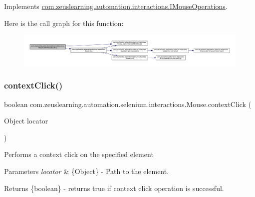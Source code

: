 Implements \hyperlink{interfacecom_1_1zeuslearning_1_1automation_1_1interactions_1_1IMouseOperations_a0a40b7faf1ddcc224debbe0c51526a4e}{com.\+zeuslearning.\+automation.\+interactions.\+I\+Mouse\+Operations}.

Here is the call graph for this function\+:
\nopagebreak
\begin{figure}[H]
\begin{center}
\leavevmode
\includegraphics[width=350pt]{d0/dfa/classcom_1_1zeuslearning_1_1automation_1_1selenium_1_1interactions_1_1Mouse_a08be5c1a9eb96f3c8c518b9518f83769_cgraph}
\end{center}
\end{figure}
\hypertarget{classcom_1_1zeuslearning_1_1automation_1_1selenium_1_1interactions_1_1Mouse_afdefed49a206fa9bfcc3dc3f088f8580}{}\label{classcom_1_1zeuslearning_1_1automation_1_1selenium_1_1interactions_1_1Mouse_afdefed49a206fa9bfcc3dc3f088f8580} 
\subsubsection{\texorpdfstring{context\+Click()}{contextClick()}}
{\footnotesize\ttfamily boolean com.\+zeuslearning.\+automation.\+selenium.\+interactions.\+Mouse.\+context\+Click (\begin{DoxyParamCaption}\item[{Object}]{locator }\end{DoxyParamCaption})\hspace{0.3cm}{\ttfamily [inline]}}

Performs a context click on the specified element


\begin{DoxyParams}{Parameters}
{\em locator} & \{Object\} -\/ Path to the element. \\
\hline
\end{DoxyParams}
\begin{DoxyReturn}{Returns}
\{boolean\} -\/ returns {\ttfamily true} if context click operation is successful. 
\end{DoxyReturn}


